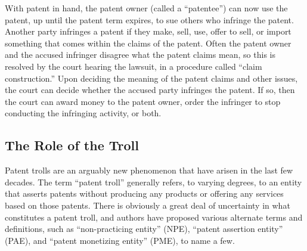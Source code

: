 \documentclass[11pt,twocolumn,titlepage]{article}
\begin{document}
With patent in hand, the patent owner (called a ``patentee'') can now use the
patent, up until the patent term expires, to sue others who infringe the
patent.
Another party infringes a patent if they make, sell, use, offer to sell, or
import something that comes within the claims of the patent. Often the
patent
owner and the accused infringer disagree what the patent claims mean, so this is
resolved by the court hearing the lawsuit, in a procedure called ``claim
construction.'' Upon deciding
the meaning of the patent claims and other issues,
the court can decide whether the accused party infringes the patent. If so,
then the court can award money to the patent owner, order the infringer to stop
conducting the infringing activity, or both.

\subsection{The Role of the Troll}
\SectionNote

Patent trolls are an arguably new phenomenon that have arisen in the last few
decades. The term ``patent troll'' generally refers, to varying
degrees, to an entity that asserts patents without producing any products or
offering any services based on those patents. There is obviously a great deal of
uncertainty in what constitutes a patent troll, and authors have proposed
various alternate terms and definitions, such as ``non-practicing entity''
(NPE), ``patent assertion entity'' (PAE), and ``patent monetizing entity''
(PME), to name a few.
\end{document}
